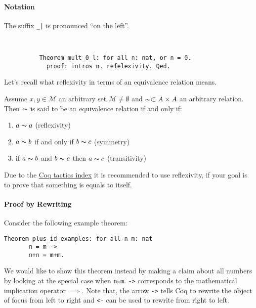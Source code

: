      \paragraph{Notation} 
     The suffix \lstinline!_|! is pronounced ``on the left''. 
     \begin{example} ~\ \vspace{-5mm}
	     \begin{lstlisting} 
	      Theorem mult_0_l: for all n: nat, or n = 0.
	        proof: intros n. refelexivity. Qed.
	     \end{lstlisting}
     \end{example} 
  
   Let's recall what reflexivity in terms of an equivalence relation means.  
   \begin{definition}
   Assume $x,y\in \mathcal{M}$ an arbitrary set $\mathcal{M}\neq\emptyset$ and $\thicksim\subset A \times A $ an arbitrary relation.
   Then $\thicksim$ is said to be an equivalence relation if and only if:
   \begin{enumerate}
   \item $a\thicksim a$ (reflexivity)
   \item $a \thicksim b$ if and only if $b \thicksim c$ (symmetry)
   \item if $a \thicksim b$ and $ b\thicksim c$ then $a \thicksim c$ (transitivity) 
   \end{enumerate}
   \end{definition}
     
   Due to the \href{https://pjreddie.com/coq-tactics/}{Coq tactics index} it is recommended to use reflexivity, if your goal is to prove that something is equals to itself.  
      
     \paragraph{Proof by Rewriting}
     
     Consider the following example theorem:     
	 \begin{lstlisting}[caption=Example]
	 Theorem plus_id_examples: for all n m: nat
       n = m -> 
	   n+n = m+m.	 
	 \end{lstlisting}
	 We would like to show this theorem instead by making a claim about all numbers by looking at the special case when \lstinline!n=m!.
     \lstinline!->! corresponds to the mathematical implication operator $\implies$. 
     Note that, the arrow \lstinline!->! tells Coq to rewrite the object of focus from left to right and \lstinline!<-! can be used to rewrite from right to left.\\
     
